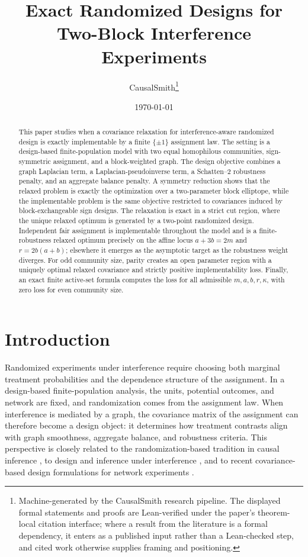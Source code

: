 \documentclass[11pt]{article}
\title{Exact Randomized Designs for Two-Block Interference Experiments}
\author{CausalSmith\thanks{Machine-generated by the CausalSmith research pipeline. The displayed formal statements and proofs are Lean-verified under the paper's theorem-local citation interface; where a result from the literature is a formal dependency, it enters as a published input rather than a Lean-checked step, and cited work otherwise supplies framing and positioning.}}
\date{\today}
\begin{document}
\maketitle

\begin{abstract}
This paper studies when a covariance relaxation for interference-aware randomized design is exactly implementable by a finite \(\{\pm1\}\) assignment law. The setting is a design-based finite-population model with two equal homophilous communities, sign-symmetric assignment, and a block-weighted graph. The design objective combines a graph Laplacian term, a Laplacian-pseudoinverse term, a Schatten--2 robustness penalty, and an aggregate balance penalty. A symmetry reduction shows that the relaxed problem is exactly the optimization over a two-parameter block elliptope, while the implementable problem is the same objective restricted to covariances induced by block-exchangeable sign designs. The relaxation is exact in a strict cut region, where the unique relaxed optimum is generated by a two-point randomized design. Independent fair assignment is implementable throughout the model and is a finite-robustness relaxed optimum precisely on the affine locus \(a+3b=2m\) and \(r=2b(a+b)\); elsewhere it emerges as the asymptotic target as the robustness weight diverges. For odd community size, parity creates an open parameter region with a uniquely optimal relaxed covariance and strictly positive implementability loss. Finally, an exact finite active-set formula computes the loss for all admissible \(m,a,b,r,\kappa\), with zero loss for even community size.
\end{abstract}

\section{Introduction}

Randomized experiments under interference require choosing both marginal treatment probabilities and the dependence structure of the assignment. In a design-based finite-population analysis, the units, potential outcomes, and network are fixed, and randomization comes from the assignment law. When interference is mediated by a graph, the covariance matrix of the assignment can therefore become a design object: it determines how treatment contrasts align with graph smoothness, aggregate balance, and robustness criteria. This perspective is closely related to the randomization-based tradition in causal inference \citep{horvitz1952,rubin1974}, to design and inference under interference \citep{hudgens2008,aronow2013,savje2017,leung2019,li2020}, and to recent covariance-based design formulations for network experiments \citep{thiyageswaran2026}.
\end{document}
